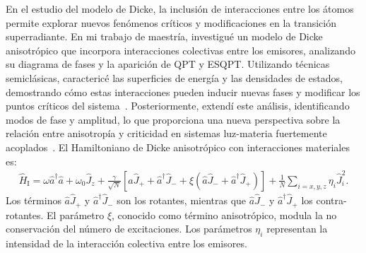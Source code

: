 \documentclass[onecolumn,notitlepage,letterpaper,aps,pra,12pt]{article}
\numberwithin{equation}{section}
\begin{document}
En el estudio del modelo de Dicke, la inclusión de interacciones entre los átomos permite explorar nuevos fenómenos críticos y modificaciones en la transición superradiante. En mi trabajo de maestría, investigué un modelo de Dicke anisotrópico que incorpora interacciones colectivas entre los emisores, analizando su diagrama de fases y la aparición de QPT y ESQPT. Utilizando técnicas semiclásicas, caractericé las superficies de energía y las densidades de estados, demostrando cómo estas interacciones pueden inducir nuevas fases y modificar los puntos críticos del sistema~\cite{Herrera2022}. Posteriormente, extendí este análisis, identificando modos de fase y amplitud, lo que proporciona una nueva perspectiva sobre la relación entre anisotropía y criticidad en sistemas luz-materia fuertemente acoplados~\cite{herrera2024}. El Hamiltoniano de Dicke anisotrópico con interacciones materiales es:
\begin{gather}\label{Hamiltoniano de Dicke con interacciones}
    \hat{H}_{\text{I}} = \omega\hat{a}^{\dagger}\hat{a} + \omega_{0}\hat{J}_{z} + \frac{\gamma}{\sqrt{N}}\left[ \hat{a}\hat{J}_{+} + \hat{a}^{\dagger}\hat{J}_{-} + \xi\left( \hat{a}\hat{J}_{-} + \hat{a}^{\dagger}\hat{J}_{+} \right)  \right] + \frac{1}{N}\sum_{i=x,y,z} \eta_{i}\hat{J}_{i}^{2}.
\end{gather}
Los términos $\hat{a}\hat{J}_{+}$ y $\hat{a}^{\dagger}\hat{J}_{-}$ son los rotantes, mientras que $\hat{a}\hat{J}_{-}$ y $\hat{a}^{\dagger}\hat{J}_{+}$ los contra-rotantes. El parámetro $\xi$, conocido como término anisotrópico, modula la no conservación del número de excitaciones. Los parámetros $\eta_{i}$ representan la intensidad de la interacción colectiva entre los emisores.
\end{document}
